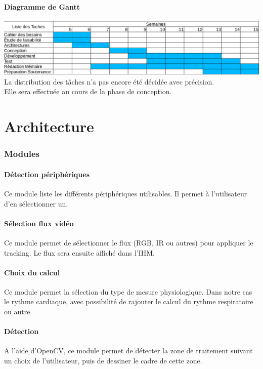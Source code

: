 \documentclass[12pt,a4paper]{article}
\begin{document}
\subsection{Diagramme de Gantt}
\includegraphics[scale=0.40]{Gantt.png}
La distribution des tâches n'a pas encore été décidée avec précision.\\ Elle sera effectuée au cours de la phase de conception.
\newpage








\part*{Architecture}
\setcounter{section}{0}
\section{Modules}

\subsection{Détection périphériques}
Ce module liste les différents périphériques utilisables. Il permet à l'utilisateur d'en sélectionner un.

\subsection{Sélection flux vidéo}

Ce module permet de sélectionner le flux (RGB, IR ou autres) pour appliquer le tracking. Le flux sera ensuite affiché dans l'IHM.

\subsection{Choix du calcul}
Ce module permet la sélection du type de mesure physiologique. Dans notre cas le rythme cardiaque, avec possibilité de rajouter le calcul du rythme respiratoire ou autre.

\subsection{Détection}
A l'aide d'OpenCV, ce module permet de détecter la zone de traitement suivant un choix de l'utilisateur, puis de dessiner le cadre de cette zone.
\end{document}
